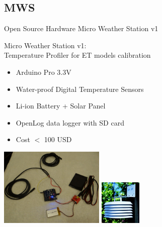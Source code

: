 \documentclass[xcolor=dvipsnames,beamer]{beamer} %
\begin{document}
\subsection{MWS}
\begin{frame}[fragile]{Open Source Hardware Micro Weather Station v1}

Micro Weather Station v1:\\
Temperature Profiler for ET models calibration
\vspace{5mm}
\begin{itemize}
 \item Arduino Pro 3.3V
 \item Water-proof Digital Temperature Sensors
 \item Li-ion Battery + Solar Panel
 \item OpenLog data logger with SD card
 \item Cost $<$ 100 USD
\end{itemize}
\begin{flushright}
  \includegraphics[width=5cm]{MWS}
  \hspace{5mm}
  \includegraphics[width=2cm]{MWS_radshield}
\end{flushright}
\end{frame}
\end{document}
